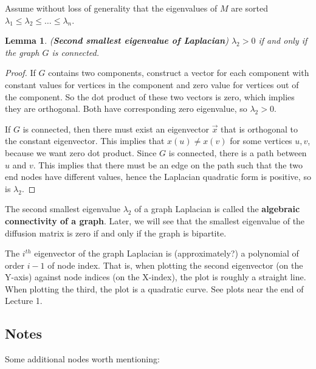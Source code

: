 \documentclass[]{article}
\newtheorem{lemma}{Lemma}[section]
\begin{document}
	Assume without loss of generality that the eigenvalues of $M$ are sorted $\lambda_1 \le \lambda_2 \le \dots \le \lambda_n$. 
	
	\begin{lemma} (\textbf{Second smallest eigenvalue of Laplacian})
		$\lambda_2 > 0$ if and only if the graph $G$ is connected. 
	\end{lemma}
	\begin{proof}
		If $G$ contains two components, construct a vector for each component with constant values for vertices in the component and zero value for vertices out of the component. So the dot product of these two vectors is zero, which implies they are orthogonal. Both have corresponding zero eigenvalue, so $\lambda_2 > 0$. 
		
		If $G$ is connected, then there must exist an eigenvector $\vec{x}$ that is orthogonal to the constant eigenvector. This implies that $x(u) \neq x(v)$ for some vertices $u,v$, because we want zero dot product. Since $G$ is connected, there is a path between $u$ and $v$. This implies that there must be an edge on the path such that the two end nodes have different values, hence the Laplacian quadratic form is positive, so is $\lambda_2$.
	\end{proof}
	
	The second smallest eigenvalue $\lambda_2$ of a graph Laplacian is called the \textbf{algebraic connectivity of a graph}. Later, we will see that the smallest eigenvalue of the diffusion matrix is zero if and only if the graph is bipartite. 
	
	The $i^{th}$ eigenvector of the graph Laplacian is (approximately?) a polynomial of order $i-1$ of node index. That is, when plotting the second eigenvector (on the Y-axis) against node indices (on the X-index), the plot is roughly a straight line. When plotting the third, the plot is a quadratic curve. See plots near the end of Lecture 1. 
	
	\subsection{Notes}
	Some additional nodes worth mentioning: 
	
\end{document}
